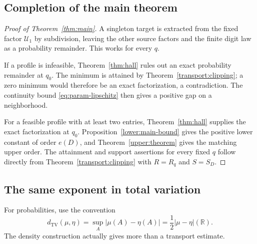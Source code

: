 \documentclass[11pt,letterpaper]{article}
\theoremstyle{definition}
\theoremstyle{remark}
\newcommand{\R}{\mathbb R}
\newcommand{\Un}{\mathcal U}
\begin{document}
\subsection{Completion of the main theorem}
\begin{proof}[Proof of Theorem~\ref{thm:main}]
A singleton target is extracted from the fixed factor $\Un_1$ by subdivision, leaving the other source factors and the finite digit law as a probability remainder. This works for every $q$.

If a profile is infeasible, Theorem~\ref{thm:hall} rules out an exact probability remainder at $q_0$. The minimum is attained by Theorem~\ref{transport:clipping}; a zero minimum would therefore be an exact factorization, a contradiction. The continuity bound \eqref{eq:param-lipschitz} then gives a positive gap on a neighborhood.

For a feasible profile with at least two entries, Theorem~\ref{thm:hall} supplies the exact factorization at $q_0$. Proposition~\ref{lower:main-bound} gives the positive lower constant of order $e(D)$, and Theorem~\ref{upper:theorem} gives the matching upper order. The attainment and support assertions for every fixed $q$ follow directly from Theorem~\ref{transport:clipping} with $R=R_q$ and $S=S_D$.
\end{proof}

\subsection{The same exponent in total variation}\label{sec:total-variation}
For probabilities, use the convention
\[
 d_{\mathrm{TV}}(\mu,\eta)=\sup_A|\mu(A)-\eta(A)|
 =\frac12|\mu-\eta|(\R).
\]
The density construction actually gives more than a transport estimate.
\end{document}
